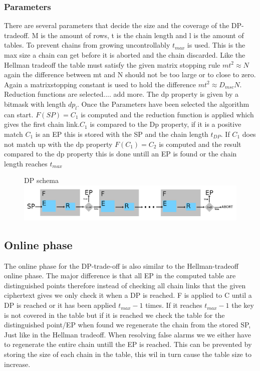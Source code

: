 \subsubsection{Parameters}
There are several parameters that decide the size and the coverage of
the DP-tradeoff. M is the amount of rows, t is the chain length  and l is the amount of tables.
To prevent chains from growing uncontrollably $t_{max}$ is used. This is the max size a chain can get before it is aborted and the chain discarded.
Like the Hellman tradeoff the table must satisfy the
given matrix stopping rule $mt^2\approx N$ again the difference between
mt and N should not be too large or to close to zero. Again a
matrixstopping constant is used to hold the difference $mt^2\approx
D_{msc}N$. Reduction functions are selected.... add more. The dp property is given by a bitmask with length $dp_l$.
Once the Parameters have been selected the algorithm can start. $F(SP)=C_1$ is computed and the reduction function is applied which gives the first chain link.$C_1$ is compared to the Dp property, if it is a positive match $C_1$ is an EP this is stored with the SP and the chain length $t_{DP}$. If $C_1$ does not match up with the dp property $F(C_1)=C_2$ is computed and the result compared to the dp property this is done untill an EP is found or the chain length reaches $t_{max}$
\begin{figure}[th]
  DP schema
  \includegraphics[width=\textwidth]{figures/DPSchema.png}
  \centering
\end{figure}
\subsection{Online phase}
The online phase for the DP-trade-off is also similar to the Hellman-tradeoff online phase. The major difference is that all EP in the computed table are distinguished points therefore instead of checking all chain links that the given ciphertext gives we only check it when a DP is reached. F is applied to C until a DP is reached or it has been applied $t_{max}-1$ times. If it reaches $t_{max}-1$ the key is not covered in the table but if it is reached we check the table for the distinguished point/EP when found we regenerate the chain from the stored SP, Just like in the Hellman tradeoff. When resolving false alarms we we either have to regenerate the entire chain untill the EP is reached. This can be prevented by storing the size of each chain in the table, this wil in turn cause the table size to increase.


